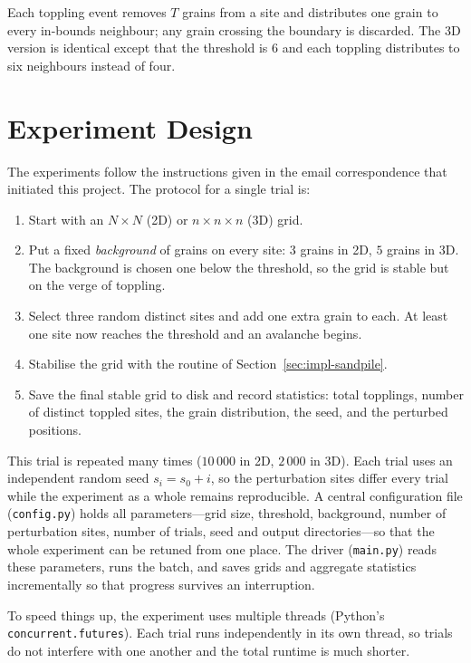 \documentclass[main.tex]{subfiles}
\begin{document}
Each toppling event removes $T$ grains from a site and distributes one grain to every in-bounds neighbour; any grain crossing the boundary is discarded. The 3D version is identical except that the threshold is $6$ and each toppling distributes to six neighbours instead of four.

\section{Experiment Design}
\label{sec:experiment-design}

The experiments follow the instructions given in the email correspondence that initiated this project. The protocol for a single trial is:

\begin{enumerate}
    \item Start with an $N \times N$ (2D) or $n \times n \times n$ (3D) grid.
    \item Put a fixed \emph{background} of grains on every site: $3$ grains in 2D, $5$ grains in 3D. The background is chosen one below the threshold, so the grid is stable but on the verge of toppling.
    \item Select three random distinct sites and add one extra grain to each. At least one site now reaches the threshold and an avalanche begins.
    \item Stabilise the grid with the routine of Section~\ref{sec:impl-sandpile}.
    \item Save the final stable grid to disk and record statistics: total topplings, number of distinct toppled sites, the grain distribution, the seed, and the perturbed positions.
\end{enumerate}

This trial is repeated many times ($10\,000$ in 2D, $2\,000$ in 3D). Each trial uses an independent random seed $s_i = s_0 + i$, so the perturbation sites differ every trial while the experiment as a whole remains reproducible. A central configuration file (\texttt{config.py}) holds all parameters---grid size, threshold, background, number of perturbation sites, number of trials, seed and output directories---so that the whole experiment can be retuned from one place. The driver (\texttt{main.py}) reads these parameters, runs the batch, and saves grids and aggregate statistics incrementally so that progress survives an interruption.

To speed things up, the experiment uses multiple threads (Python's \texttt{concurrent.futures}). Each trial runs independently in its own thread, so trials do not interfere with one another and the total runtime is much shorter.
\end{document}
